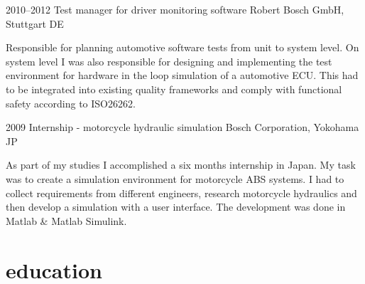 \documentclass[]{friggeri-cv} %
\begin{document}
\begin{entrylist}
\entry
{2010--2012}
{Test manager for driver monitoring software}
{Robert Bosch GmbH, Stuttgart DE}
{Responsible for planning automotive software tests from unit to system level. On system level I was also responsible for designing and implementing the test environment for hardware in the loop simulation of a automotive ECU. This had to be integrated into existing quality frameworks and comply with functional safety according to ISO26262.

}
\end{entrylist}
\begin{entrylist}
\entry
{2009}
{Internship - motorcycle hydraulic simulation}
{Bosch Corporation, Yokohama JP}
{As part of my studies I accomplished a six months internship in Japan. My task was to create a simulation environment for motorcycle ABS systems. I had to collect requirements from different engineers, research motorcycle hydraulics and then develop a simulation with a user interface. The development was done in Matlab \& Matlab Simulink.

}
\end{entrylist}

\newpage
\section{\color{blue}education}
\end{document}
